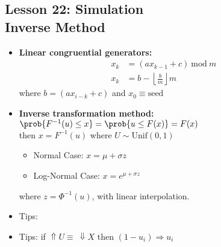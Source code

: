 \documentclass[10pt, french]{article}
\begin{document}
\begin{multicols*}{3}
\section*{Lesson 22: Simulation \\ Inverse Method}
\begin{itemize}[align=left,leftmargin=*]
    \item \textbf{Linear congruential generators:}
    \begin{align*}
        x_k &= (ax_{k-1}+c)\: \mathrm{mod}\: m \\
        x_k &= b - \left\lfloor \frac{b}{m} \right\rfloor m
    \end{align*}
    where $b = (ax_{i-k}+c)$ and $x_0\equiv\mathrm{seed}$
    \item \textbf{Inverse transformation method:}\\ $ \prob{F^{-1}(u)\leq x} = \prob{u\leq F(x)} = F(x) $ \\ then $x = F^{-1}(u)$ where $U \sim \mathrm{Unif}(0,1)$
    \begin{itemize}
        \item Normal Case: $x = \mu + \sigma z$
        \item Log-Normal Case: $x = e^{\mu + \sigma z}$
    \end{itemize}
    where $z = \Phi^{-1}(u)$, with linear interpolation.
    \item Tips: {\color{AppendixColor}}
    \item Tips: if $\Uparrow U \equiv\: \Downarrow X$ then $(1-u_i)\Rightarrow u_i$
\end{itemize}


\end{multicols*}
\end{document}
